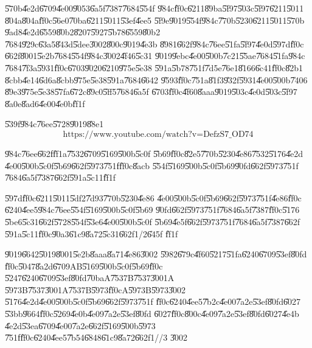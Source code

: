 \documentclass{article}
\begin{document}
\newpage

\U{570b}\U{4e2d}\U{6709}\U{4e00}\U{9053}\U{6a5f}\U{7387}\U{7684}\U{554f}%
\U{984c}\U{ff0c}\U{6211}\U{89ba}\U{5f97}\U{503c}\U{5f97}\U{6211}\U{5011}%
\U{804a}\U{804a}\U{ff0c}\U{56e0}\U{70ba}\U{6211}\U{5011}\U{53ef}\U{4ee5}%
\U{5f9e}\U{9019}\U{554f}\U{984c}\U{770b}\U{5230}\U{6211}\U{5011}\U{570b}%
\U{9ad8}\U{4e2d}\U{6559}\U{80b2}\U{8207}\U{5927}\U{5b78}\U{6559}\U{80b2}%
\U{7684}\U{929c}\U{63a5}\U{843d}\U{5dee}\U{3002}\U{800c}\U{9019}\U{4e3b}%
\U{8981}\U{662f}\U{984c}\U{76ee}\U{51fa}\U{5f97}\U{4e0d}\U{597d}\U{ff0c}%
\U{662f}\U{8001}\U{5e2b}\U{7684}\U{554f}\U{984c}\U{3002}\U{4f46}\U{5c31}%
\U{9019}\U{9ebc}\U{4e00}\U{500b}\U{7c21}\U{55ae}\U{7684}\U{51fa}\U{984c}%
\U{7684}\U{7f3a}\U{5931}\U{ff0c}\U{6703}\U{9020}\U{6210}\U{975e}\U{5e38}%
\U{591a}\U{5b78}\U{751f}\U{7d5e}\U{76e1}\U{8166}\U{6c41}\U{ff0c}\U{82b1}%
\U{8cbb}\U{4e14}\U{6d6a}\U{8cbb}\U{975e}\U{5e38}\U{591a}\U{7684}\U{6642}%
\U{9593}\U{ff0c}\U{751a}\U{81f3}\U{932f}\U{5931}\U{4e00}\U{500b}\U{7406}%
\U{89e3}\U{975e}\U{5e38}\U{57fa}\U{672c}\U{89c0}\U{5ff5}\U{7684}\U{6a5f}%
\U{6703}\U{ff0c}\U{4f60}\U{8aaa}\U{9019}\U{503c}\U{4e0d}\U{503c}\U{5f97}%
\U{8a0e}\U{8ad6}\U{4e00}\U{4e0b}\U{ff1f}

\U{539f}\U{984c}\U{76ee}\U{5728}\U{9019}\U{88e1}%
\[
\text{https://www.youtube.com/watch?v=DefzS7\_OD74}
\]

\bigskip

\U{984c}\U{76ee}\U{662f}\U{ff1a}\U{7532}\U{6709}\U{5169}\U{500b}\U{5c0f}%
\U{5b69}\U{ff0c}\U{82e5}\U{770b}\U{5230}\U{4e86}\U{7532}\U{5176}\U{4e2d}%
\U{4e00}\U{500b}\U{5c0f}\U{5b69}\U{662f}\U{5973}\U{751f}\U{ff0c}\U{8acb}%
\U{554f}\U{5169}\U{500b}\U{5c0f}\U{5b69}\U{90fd}\U{662f}\U{5973}\U{751f}%
\U{7684}\U{6a5f}\U{7387}\U{662f}\U{591a}\U{5c11}\U{ff1f}

\bigskip

\U{597d}\U{ff0c}\U{6211}\U{5011}\U{5df2}\U{7d93}\U{770b}\U{5230}\U{4e86}%
\U{4e00}\U{500b}\U{5c0f}\U{5b69}\U{662f}\U{5973}\U{751f}\U{4e86}\U{ff0c}%
\U{6240}\U{4ee5}\U{984c}\U{76ee}\U{554f}\U{5169}\U{500b}\U{5c0f}\U{5b69}%
\U{90fd}\U{662f}\U{5973}\U{751f}\U{7684}\U{6a5f}\U{7387}\U{ff0c}\U{5176}%
\U{5be6}\U{5c31}\U{662f}\U{5728}\U{554f}\U{53e6}\U{4e00}\U{500b}\U{5c0f}%
\U{5b69}\U{4e5f}\U{662f}\U{5973}\U{751f}\U{7684}\U{6a5f}\U{7387}\U{662f}%
\U{591a}\U{5c11}\U{ff0c}\U{90a3}\U{61c9}\U{8a72}\U{5c31}\U{662f}1/2\U{645f}%
\U{ff1f}

\bigskip

\U{9019}\U{6642}\U{5019}\U{8001}\U{5e2b}\U{8aaa}\U{8a71}\U{4e86}\U{3002}%
\U{5982}\U{679c}\U{4f60}\U{5217}\U{51fa}\U{6240}\U{6709}\U{53ef}\U{80fd}%
\U{ff0c}\U{5047}\U{8a2d}\U{6709}AB\U{5169}\U{500b}\U{5c0f}\U{5b69}\U{ff0c}%
\U{5247}\U{6240}\U{6709}\U{53ef}\U{80fd}\U{70ba}A\U{7537}B\U{7537}\U{3001}A%
\U{5973}B\U{7537}\U{3001}A\U{7537}B\U{5973}\U{ff0c}A\U{5973}B\U{5973}\U{3002}%
\U{5176}\U{4e2d}\U{4e00}\U{500b}\U{5c0f}\U{5b69}\U{662f}\U{5973}\U{751f}%
\U{ff0c}\U{6240}\U{4ee5}\U{7b2c}\U{4e00}\U{7a2e}\U{53ef}\U{80fd}\U{6027}%
\U{53bb}\U{9664}\U{ff0c}\U{5269}\U{4e0b}\U{4e09}\U{7a2e}\U{53ef}\U{80fd}%
\U{6027}\U{ff0c}\U{800c}\U{4e09}\U{7a2e}\U{53ef}\U{80fd}\U{6027}\U{4e4b}%
\U{4e2d}\U{53ea}\U{6709}\U{4e00}\U{7a2e}\U{662f}\U{5169}\U{500b}\U{5973}%
\U{751f}\U{ff0c}\U{6240}\U{4ee5}\U{7b54}\U{6848}\U{61c9}\U{8a72}\U{662f}1//3%
\U{3002}
\end{document}
